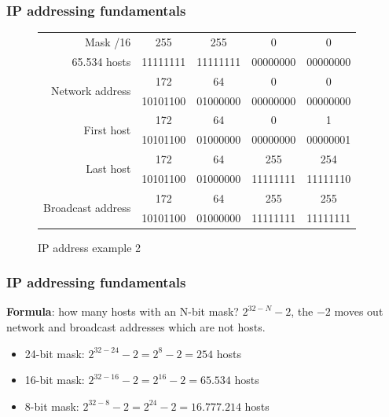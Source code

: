   \begin{frame}
    \frametitle{IP addressing fundamentals}
    \begin{figure}
        \centering
      \begin{tabular}{|r|cccc|}
        \hline
        Mask {\color{brown}/16} & {\color{brown}255} & {\color{brown}255} & {\color{fuchsia}0} & {\color{fuchsia}0} \\
        65.534 {\color{blue}hosts} & {\color{brown}11111111} & {\color{brown}11111111} & {\color{fuchsia}00000000} & {\color{fuchsia}00000000} \\ \hline
        \multirow{2}{*}{Network address} & \color{ForestGreen}172 & \color{ForestGreen}64 & \color{blue}0 & \color{blue}0 \\
        & \color{ForestGreen}10101100 & \color{ForestGreen}01000000 & \color{blue}00000000 & \color{blue}00000000 \\ \hline
        \multirow{2}{*}{First host} & \color{ForestGreen}172 & \color{ForestGreen}64 & \color{blue}0 & \color{blue}1 \\
        & \color{ForestGreen}10101100 & \color{ForestGreen}01000000 & \color{blue}00000000 & \color{blue}00000001 \\ \hline
        \multirow{2}{*}{Last host} & \color{ForestGreen}172 & \color{ForestGreen}64 & \color{blue}255 & \color{blue}254 \\
        & \color{ForestGreen}10101100 & \color{ForestGreen}01000000 & \color{blue}11111111 & \color{blue}11111110 \\ \hline
        \multirow{2}{*}{Broadcast address} & \color{ForestGreen}172 & \color{ForestGreen}64 & \color{blue}255 & \color{blue}255 \\
        & \color{ForestGreen}10101100 & \color{ForestGreen}01000000 & \color{blue}11111111 & \color{blue}11111111 \\ \hline
      \end{tabular}
      \caption{IP address example 2}
    \end{figure}
  \end{frame}

  \begin{frame}
    \frametitle{IP addressing fundamentals}
    \begin{block}{\textbf{Formula}: how many {\color{blue}hosts} with an N-bit mask?}
      $2^{32-N}-2$, the $-2$ moves out network and broadcast addresses which are not {\color{blue}hosts}.
      \begin{itemize}
        \item 24-bit {\color{brown}mask}: $2^{32-24}-2 = 2^{8}-2 = 254$ {\color{blue}hosts}
        \item 16-bit {\color{brown}mask}: $2^{32-16}-2 = 2^{16}-2 = 65.534$ {\color{blue}hosts}
        \item 8-bit {\color{brown}mask}: $2^{32-8}-2 = 2^{24}-2 = 16.777.214$ {\color{blue}hosts}
      \end{itemize}
    \end{block}
  \end{frame}

